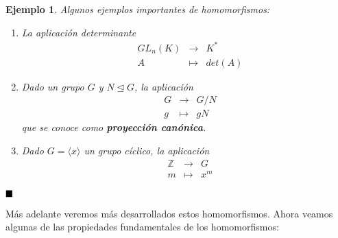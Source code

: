 \documentclass[12pt]{article}
\newtheorem{example}{Ejemplo}[theorem]
\begin{document}
\begin{example}\label{eq:ejsHoms} Algunos ejemplos importantes de homomorfismos:
\begin{enumerate}
\item La aplicación determinante $$\begin{array}{rccl}
&GL_n(K)&\longrightarrow &K^* \\
&A& \longmapsto &det(A)
\end{array}
$$
\item Dado un grupo $G$ y $N \unlhd G$, la aplicación $$\begin{array}{rccl}
&G&\longrightarrow &G/N \\
&g& \longmapsto &gN
\end{array}
$$ que se conoce como \textbf{proyección canónica}.
\item Dado $G = \langle x \rangle$ un grupo cíclico, la aplicación $$\begin{array}{rccl}
&\mathbb{Z}&\longrightarrow &G \\
&m& \longmapsto &x^m
\end{array}
$$
\end{enumerate}
\end{example}

$\hfill \blacksquare$

Más adelante veremos más desarrollados estos homomorfismos. Ahora veamos algunas de las propiedades fundamentales de los homomorfismos:
\end{document}
